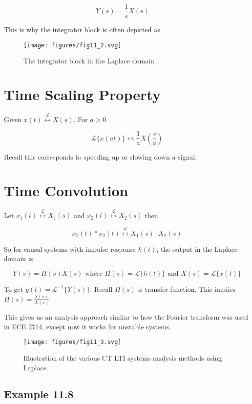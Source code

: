 \documentclass{article}
\begin{document}
\[
Y(s) = \frac{1}{s} X(s) \quad .
\]

This is why the integrator block is often depicted as

\begin{figure}
  \centering
  \texttt{[image: figures/fig11\_2.svg]}
  \caption{The integrator block in the Laplace domain.}
\end{figure}

\section{Time Scaling Property}

Given $x(t) \stackrel{\mathcal{L}}{\longleftrightarrow} X(s)$. For $a>0$

$$
\mathcal{L}\{x(a t)\} \longleftrightarrow \frac{1}{a} X\left(\frac{s}{a}\right)
$$

Recall this corresponds to speeding up or slowing down a signal.

\section{Time Convolution}

Let $x_{1}(t) \stackrel{\mathcal{L}}{\longleftrightarrow} X_{1}(s)$ and $x_{2}(t) \stackrel{\mathcal{L}}{\longleftrightarrow} X_{2}(s)$ then

$$
x_{1}(t) * x_{2}(t) \stackrel{\mathcal{L}}{\longleftrightarrow} X_{1}(s)\cdot X_{2}(s)
$$

So for causal systems with impulse response $h(t)$, the output in the Laplace domain is

$$
Y(s)=H(s) X(s) \text { where } H(s)=\mathcal{L}\{h(t)\} \text { and } X(s)=\mathcal{L}\{x(t)\}
$$

To get $y(t)=\mathcal{L}^{-1}\{Y(s)\}$. Recall $H(s)$ is transfer function. This implies $H(s)=\frac{Y(s)}{X(s)}$

This gives us an analysis approach similar to how the Fourier transform was used in ECE 2714, except now it works for unstable systems.

\begin{figure}
  \centering
  \texttt{[image: figures/fig11\_3.svg]}
  \caption{Illustration of the various CT LTI systems analysis methods using Laplace.}
\end{figure}

\subsection{Example 11.8}
\end{document}
